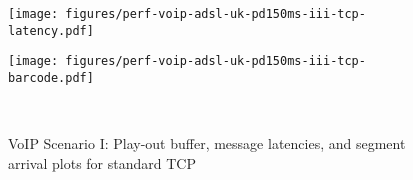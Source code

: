 \begin{figure*}[t!]
{{\begin{minipage}{61mm}
\end{minipage}
\begin{minipage}{61mm}
\texttt{[image: figures/perf-voip-adsl-uk-pd150ms-iii-tcp-latency.pdf]}\vspace{1mm}
\end{minipage}
\begin{minipage}{61mm}
\texttt{[image: figures/perf-voip-adsl-uk-pd150ms-iii-tcp-barcode.pdf]}\vspace{1mm}
\end{minipage}
\begin{minipage}{61mm}~\end{minipage}
}}
\caption{VoIP Scenario I: Play-out buffer, message latencies, and segment arrival plots for standard TCP}
\label{fig:voip-150-tcp}
\end{figure*}


